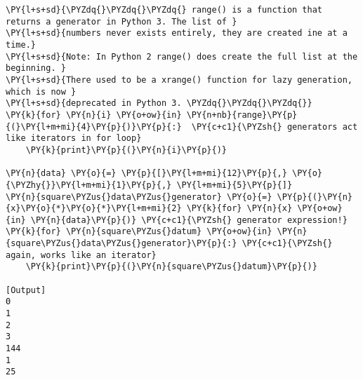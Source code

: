 \begin{Verbatim}[label=\makebox{\url{https://github.com/lucabaldini/cmepda/tree/master/slides/latex/snippets/generators.py}},commandchars=\\\{\}]
\PY{l+s+sd}{\PYZdq{}\PYZdq{}\PYZdq{} range() is a function that returns a generator in Python 3. The list of }
\PY{l+s+sd}{numbers never exists entirely, they are created ine at a time.}
\PY{l+s+sd}{Note: In Python 2 range() does create the full list at the beginning. }
\PY{l+s+sd}{There used to be a xrange() function for lazy generation, which is now }
\PY{l+s+sd}{deprecated in Python 3. \PYZdq{}\PYZdq{}\PYZdq{}}
\PY{k}{for} \PY{n}{i} \PY{o+ow}{in} \PY{n+nb}{range}\PY{p}{(}\PY{l+m+mi}{4}\PY{p}{)}\PY{p}{:}  \PY{c+c1}{\PYZsh{} generators act like iterators in for loop}
    \PY{k}{print}\PY{p}{(}\PY{n}{i}\PY{p}{)}

\PY{n}{data} \PY{o}{=} \PY{p}{[}\PY{l+m+mi}{12}\PY{p}{,} \PY{o}{\PYZhy{}}\PY{l+m+mi}{1}\PY{p}{,} \PY{l+m+mi}{5}\PY{p}{]}
\PY{n}{square\PYZus{}data\PYZus{}generator} \PY{o}{=} \PY{p}{(}\PY{n}{x}\PY{o}{*}\PY{o}{*}\PY{l+m+mi}{2} \PY{k}{for} \PY{n}{x} \PY{o+ow}{in} \PY{n}{data}\PY{p}{)} \PY{c+c1}{\PYZsh{} generator expression!}
\PY{k}{for} \PY{n}{square\PYZus{}datum} \PY{o+ow}{in} \PY{n}{square\PYZus{}data\PYZus{}generator}\PY{p}{:} \PY{c+c1}{\PYZsh{} again, works like an iterator}
    \PY{k}{print}\PY{p}{(}\PY{n}{square\PYZus{}datum}\PY{p}{)}

[Output]
0
1
2
3
144
1
25
\end{Verbatim}